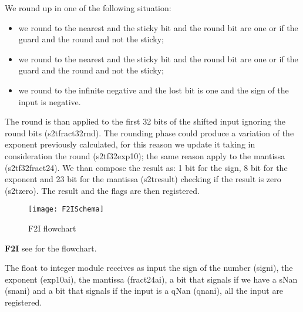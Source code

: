 We round up in one of the following situation:
\begin{itemize}
 \item we round to the nearest and the sticky bit and the round bit are one or if the guard and the round and not the sticky;
 \item we round to the nearest and the sticky bit and the round bit are one or if the guard and the round and not the sticky;
 \item we round to the infinite negative and the lost bit is one and the sign of the input is negative.
\end{itemize}
The round is than applied to the first 32 bits of the shifted input ignoring the round bits (s2t\textunderscore fract32\textunderscore rnd).
The rounding phase could produce a variation of the exponent previously calculated, for this reason we update it taking in consideration the round (s2t\textunderscore f32\textunderscore exp10); the same reason apply to the mantissa (s2t\textunderscore f32\textunderscore fract24).
We than compose the result as: 1 bit for the sign, 8 bit for the exponent and 23 bit for the mantissa (s2t\textunderscore result) checking if the result is zero (s2t\textunderscore zero).
The result and the flags are then registered.
\newline

\begin{figure}
\centering\texttt{[image: F2ISchema]}
\caption{F2I flowchart}	
\label{fig:f2i_schema}
\end{figure}

\textbf{F2I} see
 for the flowchart.
\newline

The float to integer module receives as input the sign of the number (sign\textunderscore i), the exponent (exp10a\textunderscore i), the mantissa (fract24a\textunderscore i), a bit that signals if we have a sNan (snan\textunderscore i) and a bit that signals if the input is a qNan (qnan\textunderscore i), all the input are registered.

